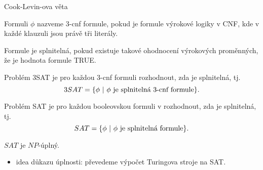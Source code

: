     
    
    \begin{frame}{Cook-Levin-ova věta}
    \begin{definition}
    Formuli $\phi$ nazveme \alert{3-cnf formule}, pokud je formule výrokové logiky v CNF, kde v každé klauzuli jsou právě tři literály.
    
    Formule \alert{je splnitelná}, pokud existuje takové ohodnocení výrokových proměnných, že je hodnota formule TRUE.
    
    Problém \alert{3SAT} je pro každou 3-cnf formuli rozhodnout, zda je splnitelná, tj.
    $$3SAT=\{\phi \ |\  \phi \hbox{ je splnitelná 3-cnf formule}\}\hbox{.}
    $$
    
    Problém \alert{SAT} je pro každou booleovskou formuli v rozhodnout, zda je splnitelná, tj.
    $$SAT=\{\phi \ |\  \phi \hbox{ je splnitelná formule}\}\hbox{.}
    $$
    \end{definition}
    
    \begin{theorem}
    $SAT$ je $NP$-úplný.
    \end{theorem}
    \begin{itemize}
        \item idea důkazu úplnosti: převedeme výpočet Turingova stroje na SAT.
    \end{itemize}
    \end{frame}
    
